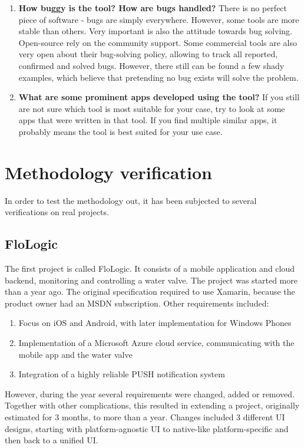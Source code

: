 \documentclass[english,master,public,dept460,male,cpdeclaration,oneside]{diploma}
\begin{document}
\begin{enumerate}
	\item \textbf{How buggy is the tool? How are bugs handled?}
	There is no perfect piece of software - bugs are simply everywhere. However, some tools are more stable than others. Very important is also the attitude towards bug solving. Open-source rely on the community support. Some commercial tools are also very open about their bug-solving policy, allowing to track all reported, confirmed and solved bugs. However, there still can be found a few shady examples, which believe that pretending no bug exists will solve the problem.
	
	\item \textbf{What are some prominent apps developed using the tool?}
	If you still are not sure which tool is most suitable for your case, try to look at some apps that were written in that tool. If you find multiple similar apps, it probably means the tool is best suited for your use case.
\end{enumerate}


\section{Methodology verification}
In order to test the methodology out, it has been subjected to several verifications on real projects. 

\subsection{FloLogic}
The first project is called FloLogic. It consists of a mobile application and cloud backend, monitoring and controlling a water valve. The project was started more than a year ago. The original specification required to use Xamarin, because the product owner had an MSDN subscription. Other requirements included:
\begin{enumerate}
	\item Focus on iOS and Android, with later implementation for Windows Phones
	\item Implementation of a Microsoft Azure cloud service, communicating with the mobile app and the water valve
	\item Integration of a highly reliable PUSH notification system
\end{enumerate}

However, during the year several requirements were changed, added or removed. Together with other complications, this resulted in extending a project, originally estimated for 3 months, to more than a year. Changes included 3 different UI designs, starting with platform-agnostic UI to native-like platform-specific and then back to a unified UI. 
\end{document}
